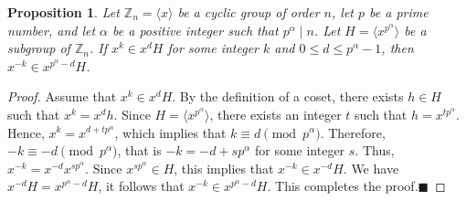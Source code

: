 \documentclass[12pt]{article}
\newtheorem{prop}[formula]{Proposition}
\begin{document}
  \begin{prop}\label{prop:inverse_coset}
  	Let $\mathbb{Z}_n=\langle x\rangle$ be a cyclic group of order $n$, let $p$ be a prime number, and let $\alpha$ be a positive integer such that $p^\alpha\mid n$. Let $H=\langle x^{p^\alpha}\rangle$ be a subgroup of $\mathbb{Z}_n$. If $x^k\in x^dH$ for some integer $k$ and $0\le d\le p^\alpha-1$, then $x^{-k}\in x^{p^\alpha-d}H$.
  \end{prop}

  \begin{proof}
  	Assume that $x^k\in x^dH$. By the definition of a coset, there exists $h\in H$ such that $x^k=x^dh$. Since $H=\langle x^{p^\alpha}\rangle$, there exists an integer $t$ such that $h=x^{tp^\alpha}$. Hence, $x^k=x^{d+tp^\alpha}$, which implies that $k\equiv d\pmod{p^\alpha}$. Therefore, $-k\equiv-d\pmod{p^\alpha}$,  that is $-k=-d+sp^\alpha$ for some integer $s$. Thus, $x^{-k}=x^{-d}x^{sp^\alpha}$. Since $x^{sp^\alpha}\in H$, this implies that $x^{-k}\in x^{-d}H$. We have $x^{-d}H=x^{p^\alpha-d}H$, it follows that $x^{-k}\in x^{p^\alpha-d}H$. This completes the proof.\hfill$\blacksquare$
  \end{proof}
\end{document}
